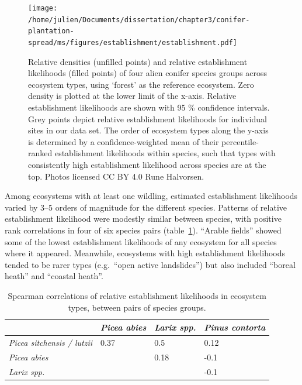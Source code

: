 \documentclass[
]{article}
\begin{document}
\newpage
\begin{landscape}

\begin{figure}
\centering
\texttt{[image: /home/julien/Documents/dissertation/chapter3/conifer-plantation-spread/ms/figures/establishment/establishment.pdf]}
\caption{\label{fig:establishment}Relative densities (unfilled points) and relative establishment likelihoods (filled points) of four alien conifer species groups across ecosystem types, using `forest' as the reference ecosystem. Zero density is plotted at the lower limit of the x-axis. Relative establishment likelihoods are shown with 95 \% confidence intervals. Grey points depict relative establishment likelihoods for individual sites in our data set. The order of ecosystem types along the y-axis is determined by a confidence-weighted mean of their percentile-ranked establishment likelihoods within species, such that types with consistently high establishment likelihood across species are at the top. Photos licensed CC BY 4.0 Rune Halvorsen.}
\end{figure}

\end{landscape}
\newpage

Among ecosystems with at least one wildling, estimated establishment likelihoods varied by 3--5 orders of magnitude for the different species.
Patterns of relative establishment likelihood were modestly similar between species, with positive rank correlations in four of six species pairs (table~\ref{tab:species-correlation-table}).
``Arable fields'' showed some of the lowest establishment likelihoods of any ecosystem for all species where it appeared.
Meanwhile, ecosystems with high establishment likelihoods tended to be rarer types (e.g.~``open active landslides'') but also included ``boreal heath'' and ``coastal heath''.

\begin{table}

\caption{\label{tab:species-correlation-table}Spearman correlations of relative establishment likelihoods in ecosystem types, between pairs of species groups.}
\centering
\begin{tabular}[t]{>{}llll}
\toprule
\em{ } & \em{Picea abies} & \em{Larix spp.} & \em{Pinus contorta}\\
\midrule
\em{Picea sitchensis / lutzii} & 0.37 & 0.5 & 0.12\\
\em{Picea abies} &  & 0.18 & -0.1\\
\em{Larix spp.} &  &  & -0.1\\
\bottomrule
\end{tabular}
\end{table}
\end{document}
